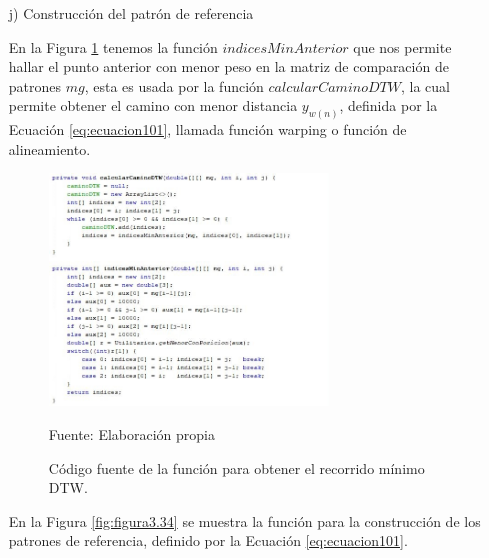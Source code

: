 \begin{enumerate}
\item[j)]Construcción del patrón de referencia
\par
En la Figura \ref{fig:figura3.33} tenemos la función $indicesMinAnterior$ que nos permite hallar el punto anterior con menor peso en la matriz de comparación de patrones $mg$, esta es usada por la función $calcularCaminoDTW$, la cual permite obtener el camino con menor distancia $y_{w(n)}$, definida por la Ecuación \eqref{eq:ecuacion101}, llamada función warping o función de alineamiento.
\begin{figure}[H]
\captionsetup{justification=centering}
\begin{center}
\includegraphics[width=0.7\textwidth]{Imagenes/Cap3/image033}
\end{center}
\begin{center}
\vskip -0.5cm
\caption{\small{Código fuente de la función para obtener el recorrido mínimo DTW.}}
\label{fig:figura3.33}
{\small{Fuente: Elaboración propia}}
\end{center}
\end{figure}
\vskip -0.5cm
En la Figura \ref{fig:figura3.34} se muestra la función para la construcción de los patrones de referencia, definido por la Ecuación \eqref{eq:ecuacion101}.
\begin{figure}[H]
\captionsetup{justification=centering}
\begin{center}

\end{center}
\end{figure}
\end{enumerate}
